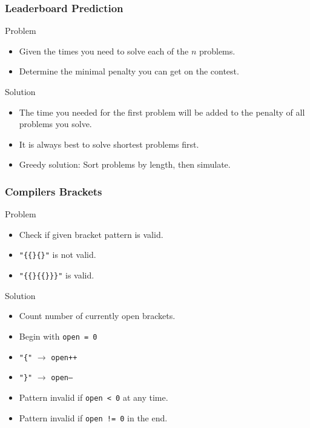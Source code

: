 \documentclass{beamer}
\begin{document}
\begin{frame}
    \frametitle{Leaderboard Prediction}
    \begin{block}{Problem}
        \begin{itemize}
            \item Given the times you need to solve each of the $n$ problems.
            \item Determine the minimal penalty you can get on the contest.
        \end{itemize}
    \end{block} \pause
    \begin{block}{Solution}
        \begin{itemize}
            \item The time you needed for the first problem will be added to the penalty of all problems you solve.
            \pause
            \item It is always best to solve shortest problems first.
            \pause
            \item Greedy solution: Sort problems by length, then simulate.
        \end{itemize}
    \end{block} 
\end{frame}

\begin{frame}
    \frametitle{Compilers Brackets}
    \begin{block}{Problem}
        \begin{itemize}
            \item Check if given bracket pattern is valid.
            \item {\tt"\{\{\}\{\}"} is not valid.
            \item {\tt"\{\{\}\{\{\}\}\}"} is valid.
        \end{itemize}
    \end{block} \pause
    \begin{block}{Solution}
        \begin{itemize}
            \item Count number of currently open brackets.
            \pause
            \item Begin with {\tt open = 0}
            \pause
            \item {\tt"\{"} $\rightarrow$ {\tt open++}
            \pause
            \item {\tt"\}"} $\rightarrow$ {\tt open--}
            \pause
            \item Pattern invalid if {\tt open < 0} at any time.
            \pause
            \item Pattern invalid if {\tt open != 0} in the end.
        \end{itemize}
    \end{block} 
\end{frame}
\end{document}
